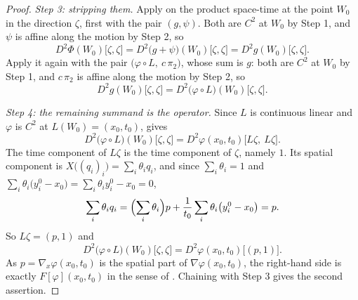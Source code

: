 \begin{proof}
\emph{Step 3: stripping them.}
Apply  on the product space-time at the point
$W_0$ in the direction $\zeta$, first with the pair $(g,\psi)$. Both are $C^2$ at $W_0$
by Step 1, and $\psi$ is affine along the motion by Step 2, so
\[
  D^2\Phi(W_0)\bigl[\zeta,\zeta\bigr]
   =D^2\bigl(g+\psi\bigr)(W_0)\bigl[\zeta,\zeta\bigr]
   =D^2g(W_0)\bigl[\zeta,\zeta\bigr].
\]
Apply it again with the pair $\bigl(\varphi\circ L,\ c\,\pi_2\bigr)$, whose sum is $g$:
both are $C^2$ at $W_0$ by Step 1, and $c\,\pi_2$ is affine along the motion by Step 2,
so
\[
  D^2g(W_0)\bigl[\zeta,\zeta\bigr]
   =D^2\bigl(\varphi\circ L\bigr)(W_0)\bigl[\zeta,\zeta\bigr].
\]

\emph{Step 4: the remaining summand is the operator.}
Since $L$ is continuous linear and $\varphi$ is $C^2$ at $L(W_0)=(x_0,t_0)$,
 gives
\[
  D^2\bigl(\varphi\circ L\bigr)(W_0)\bigl[\zeta,\zeta\bigr]
   =D^2\varphi(x_0,t_0)\bigl[L\zeta,\ L\zeta\bigr].
\]
The time component of $L\zeta$ is the time component of $\zeta$, namely $1$. Its spatial
component is $X\bigl((q_i)_i\bigr)=\sum_i\theta_iq_i$, and since $\sum_i\theta_i=1$ and
$\sum_i\theta_i\bigl(y^0_i-x_0\bigr)=\sum_i\theta_iy^0_i-x_0=0$,
\[
  \sum_i\theta_iq_i
   =\Bigl(\sum_i\theta_i\Bigr)p+\frac1{t_0}\sum_i\theta_i\bigl(y^0_i-x_0\bigr)=p .
\]
So $L\zeta=(p,1)$ and
\[
  D^2\bigl(\varphi\circ L\bigr)(W_0)\bigl[\zeta,\zeta\bigr]
   =D^2\varphi(x_0,t_0)\bigl[(p,1)\bigr].
\]
As $p=\nabla_x\varphi(x_0,t_0)$ is the spatial part of $\nabla\varphi(x_0,t_0)$, the
right-hand side is exactly $F[\varphi](x_0,t_0)$ in the sense of .
Chaining with Step 3 gives the second assertion.
\end{proof}
